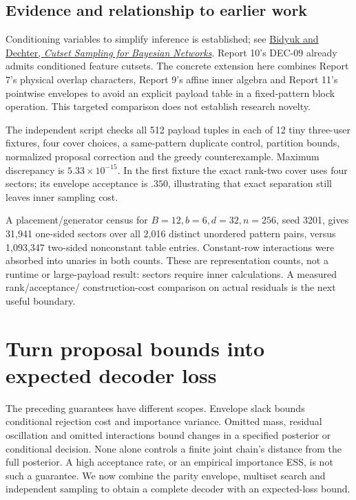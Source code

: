 \documentclass[10pt,a4paper]{article}
\begin{document}
\subsection{Evidence and relationship to earlier work}
Conditioning variables to simplify inference is established; see
\href{https://arxiv.org/abs/1110.2740}{Bidyuk and Dechter, \emph{Cutset Sampling for Bayesian Networks}}.
Report 10's DEC-09 already admits conditioned feature cutsets. The concrete extension here combines
Report 7's physical overlap characters, Report 9's affine inner algebra and Report 11's pointwise
envelopes to avoid an explicit payload table in a fixed-pattern block operation. This targeted
comparison does not establish research novelty.

The independent script  checks all 512 payload
tuples in each of 12 tiny three-user fixtures, four cover choices, a same-pattern duplicate control,
partition bounds, normalized proposal correction and the greedy counterexample. Maximum discrepancy
is $5.33\times10^{-15}$. In the first fixture the exact rank-two cover uses four sectors; its
envelope acceptance is $.350$, illustrating that exact separation still leaves inner sampling cost.

A placement/generator census for $B=12,b=6,d=32,n=256$, seed 3201, gives 31,941 one-sided sectors
over all 2,016 distinct unordered pattern pairs, versus 1,093,347 two-sided nonconstant table entries.
Constant-row interactions were absorbed into unaries in both counts. These are representation counts,
not a runtime or large-payload result: sectors require inner calculations. A measured rank/acceptance/
construction-cost comparison on actual residuals is the next useful boundary.

\section{Turn proposal bounds into expected decoder loss}
\label{sec:expected-decoder}
The preceding guarantees have different scopes. Envelope slack bounds conditional rejection cost and
importance variance. Omitted mass, residual oscillation and omitted interactions bound changes in a
specified posterior or conditional decision. None alone controls a finite joint chain's distance from
the full posterior. A high acceptance rate, or an empirical importance ESS, is not such a guarantee.
We now combine the parity envelope, multiset search and independent sampling to obtain a complete
decoder with an expected-loss bound.
\end{document}
